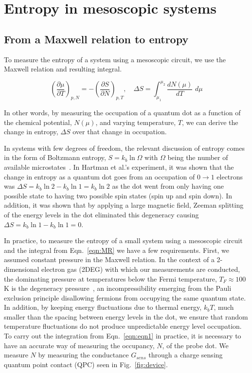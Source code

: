 
\chapter{Entropy in mesoscopic systems}
\label{ch:Theory}

\section{From a Maxwell relation to entropy}
\label{sec:mrtoentropy}

To measure the entropy of a system using a mesoscopic circuit, we use the Maxwell relation and resulting integral.

\begin{equation}
	\label{eqn:MR}
	\left( \frac{\partial \mu }{\partial T} \right)_{p,N} = -\left( \frac{\partial S}{\partial N} \right)_{p,T} , \quad
	\Delta S = \int_{\mu_1}^{\mu_2} \frac{dN(\mu)}{dT}\,\, d\mu
\end{equation}


In other words, by measuring the occupation of a quantum dot as a function of the chemical potential, $N(\mu)$, and varying temperature, $T$, we can derive the change in entropy, $\Delta S$ over that change in occupation.

In systems with few degrees of freedom, the relevant discussion of entropy comes in the form of Boltzmann entropy, $S = k_b \ln \Omega$ with $\Omega$ being the number of available microstates~\cite{schroeder}. In Hartman et al.'s experiment, it was shown that the change in entropy as a quantum dot goes from an occupation of $0 \to 1$ electrons was $\Delta S = k_b \ln 2 - k_b \ln 1 = k_b \ln 2$ as the dot went from only having one possible state to having two possible spin states (spin up and spin down). In addition, it was shown that by applying a large magnetic field, Zeeman splitting of the energy levels in the dot eliminated this degeneracy causing $\Delta S = k_b \ln 1 - k_b \ln 1 = 0$.

In practice, to measure the entropy of a small system using a mesoscopic circuit and the integral from Eqn.~\ref{eqn:MR} we have a few requirements. First, we assumed constant pressure in the Maxwell relation. In the context of a 2-dimensional electron gas (2DEG) with which our measurements are conducted, the dominating pressure at temperatures below the Fermi temperature, $T_F \approx 100$K is the degeneracy pressure~\cite{ashcroftmermin}, an incompressibility emerging from the Pauli exclusion principle disallowing fermions from occupying the same quantum state. In addition, by keeping energy fluctuations due to thermal energy, $k_bT$, much smaller than the spacing between energy levels in the dot, we ensure that random temperature fluctuations do not produce unpredictable energy level occupation.
To carry out the integration from Eqn.~\ref{eqn:eqn1} in practice, it is necessary to have an accurate way of measuring the occupancy, $N$, of the probe dot. We measure $N$ by measuring the conductance $G_{sens}$ through a charge sensing quantum point contact (QPC) seen in Fig.~\ref{fig:device}. 

